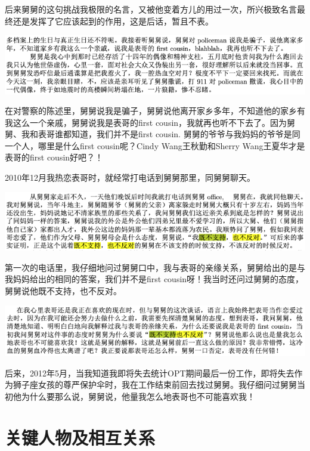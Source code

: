\documentclass[9pt, b5paper]{article}
\begin{document}
后来舅舅的这句挑战我极限的名言，又被他变着方儿的用过一次，所兴极致名言最终还是发挥了它应该起到的作用，这是后话，暂且不表。 

\begin{center}
\includegraphics[width=.9\linewidth]{./pic/p1p68-2.png}
\end{center}

在对警察的陈述里，舅舅说我是骗子，舅舅说他离开家乡多年，不知道他的家乡有我这么一个亲戚，舅舅说我是表哥的first cousin，我就再也听不下去了。因为舅舅、我和表哥谁都知道，我们并不是first cousin. 舅舅的爷爷与我妈妈的爷爷是同一个人，哪里是什么first cousin呢？Cindy Wang王秋勤和Sherry Wang王夏华才是表哥的first cousin好吧？！

2010年12月我热恋表哥时，就经常打电话到舅舅那里，同舅舅聊天。

\begin{center}
\includegraphics[width=.9\linewidth]{./pic/p1p45-2.png}
\end{center}

第一次的电话里，我仔细地问过舅舅口中，我与表哥的亲缘关系，舅舅给出的是与我妈妈给出的相同的答案，我们并不是first cousin呀！我当时还问过舅舅的态度，舅舅说他既不支持，也不反对。

\begin{center}
\includegraphics[width=.9\linewidth]{./pic/p1p120.png}
\end{center}

后来，2012年5月，当我知道我即将失去统计OPT期间最后一份工作，即将失去作为狮子座女孩的尊严保护伞时，我在工作结束前回去找过舅舅。我仔细问过舅舅当初他为什么要那么说，舅舅说，他量我怎么地表哥也不可能喜欢我！


\section{关键人物及相互关系}
\label{sec:org10d49c6}
\end{document}
